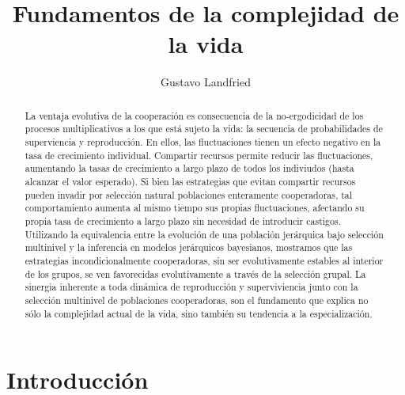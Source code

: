 \documentclass[a4paper,10pt]{article}
\title{Fundamentos de la complejidad de la vida}
\author{Gustavo Landfried}
\begin{document}
\maketitle

\begin{abstract}

La ventaja evolutiva de la cooperación es consecuencia de la no-ergodicidad de los procesos multiplicativos a los que está sujeto la vida: la secuencia de probabilidades de superviencia y reproducción.
En ellos, las fluctuaciones tienen un efecto negativo en la tasa de crecimiento individual.
Compartir recursos permite reducir las fluctuaciones, aumentando la tasas de crecimiento a largo plazo de todos los indiviudos (hasta alcanzar el valor esperado).
Si bien las estrategias que evitan compartir recursos pueden invadir por selección natural poblaciones enteramente cooperadoras, tal comportamiento aumenta al mismo tiempo sus propias fluctuaciones, afectando su propia tasa de crecimiento a largo plazo sin necesidad de introducir castigos.
Utilizando la equivalencia entre la evolución de una población jerárquica bajo selección multinivel y la inferencia en modelos jerárquicos bayesianos, mostramos que las estrategias incondicionalmente cooperadoras, sin ser evolutivamente estables al interior de los grupos, se ven favorecidas evolutivamente a través de la selección grupal.
La sinergia inherente a toda dinámica de reproducción y superviviencia junto con la selección multinivel de poblaciones cooperadoras, son el fundamento que explica no sólo la complejidad actual de la vida, sino también su tendencia a la especialización.
\end{abstract}

\section{Introducción}
\end{document}
